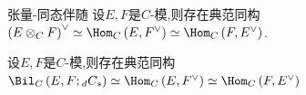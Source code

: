\begin{proposition}{张量-同态伴随}{}
	设$E,F$是$C$-模,则存在典范同构$\left(E\otimes_{C}F\right)^{\vee}\simeq\Hom_{C}\left(E,F^{\vee}\right)\simeq\Hom_{C}\left(F,E^{\vee}\right)$.
\end{proposition}

\begin{corollary}{}{}
	设$E,F$是$C$-模,则存在典范同构$\Bil_{C}\left(E,F;{}_{d}C_{s}\right)\simeq\Hom_{C}\left(E,F^{\vee}\right)\simeq\Hom_{C}\left(F,E^{\vee}\right)$
\end{corollary}




















